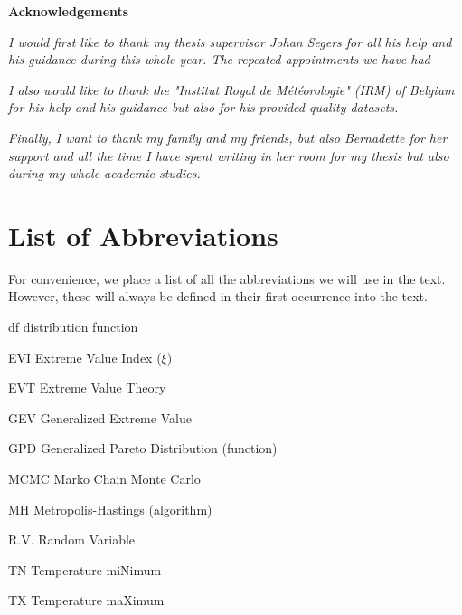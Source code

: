 \documentclass[11pt,a4paper,openany ]{book}
\newcommand{\abbrlabel}[1]{\makebox[3cm][l]{\textbf{#1}\ \dotfill}}
\newenvironment{abbreviations}{\begin{list}{}{\renewcommand{\makelabel}{\abbrlabel}}}{\end{list}}
\newcommand\blankpage{%
    \null
    \thispagestyle{empty}%
    \addtocounter{page}{-1}%
    \newpage}
\begin{document}
\newenvironment{acknowledgements}%
{\thispagestyle{empty}\null\vfill\begin{center}%
\bfseries Acknowledgements\end{center}}%
{\vfill\null}
\begin{acknowledgements}
	\textit{I would first like to thank my thesis supervisor Johan Segers for all his help and his guidance during this whole year. The repeated appointments we have had   }
	\newline
	
	\textit{I also would like to thank the "Institut Royal de Météorologie" (IRM) of Belgium for his help and his guidance but also for his provided quality datasets.}
	\newline
	
	\textit{Finally, I want to thank my family and my friends, but also Bernadette for her support and all the time I have spent  writing in her room for my thesis but also during my whole academic studies.}
	\thispagestyle{empty}
\end{acknowledgements}


\afterpage{\blankpage}


\thispagestyle{empty}
\dominitoc
\thispagestyle{empty}
\tableofcontents
\thispagestyle{empty}
\newpage
\thispagestyle{empty}
\listoffigures
\thispagestyle{empty}

\newpage


\chapter*{List of Abbreviations}
\thispagestyle{empty}
For convenience, we place a list of all the abbreviations we will use in the text. However, these will always be defined in their first occurrence into the text.\\

\begin{center}
\begin{abbreviations}
	\item [df]\label{df}  distribution function
	\item[EVI] Extreme Value Index ($\xi$)
	\item[EVT] Extreme Value Theory
	\item[GEV] Generalized Extreme Value
	\item[GPD] Generalized Pareto Distribution (function)
	\item[MCMC] Marko Chain Monte Carlo
	\item[MH] Metropolis-Hastings (algorithm)
    \item[R.V.] Random Variable
	\item[TN] Temperature miNimum
	\item[TX] Temperature maXimum
	
\end{abbreviations}
\end{center}
\end{document}

